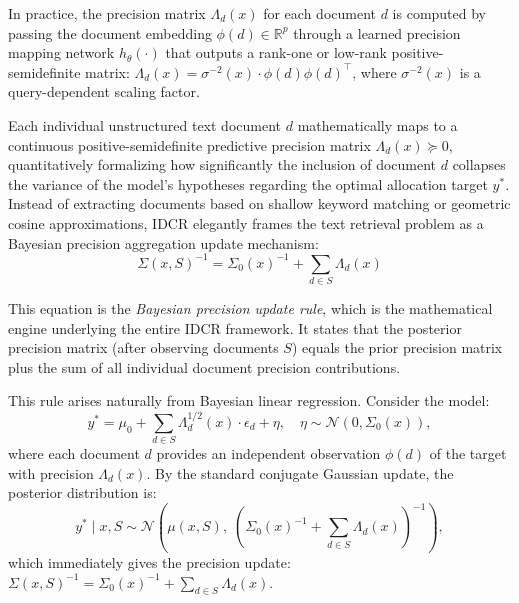 \documentclass[12pt,a4paper,oneside]{report}
\theoremstyle{definition}
\theoremstyle{remark}
\begin{document}
In practice, the precision matrix $\Lambda_d(x)$ for each document $d$ is computed by passing the document embedding $\phi(d) \in \mathbb{R}^p$ through a learned precision mapping network $h_\theta(\cdot)$ that outputs a rank-one or low-rank positive-semidefinite matrix: $\Lambda_d(x) = \sigma^{-2}(x) \cdot \phi(d) \phi(d)^\top$, where $\sigma^{-2}(x)$ is a query-dependent scaling factor.

\medskip
\noindent Each individual unstructured text document $d$ mathematically maps to a continuous positive-semidefinite predictive precision matrix $\Lambda_d(x) \succeq 0$, quantitatively formalizing how significantly the inclusion of document $d$ collapses the variance of the model's hypotheses regarding the optimal allocation target $y^*$. Instead of extracting documents based on shallow keyword matching or geometric cosine approximations, IDCR elegantly frames the text retrieval problem as a Bayesian precision aggregation update mechanism:
\begin{equation} \label{eq:bayesian_update}
\Sigma(x, S)^{-1} = \Sigma_0(x)^{-1} + \sum_{d \in S} \Lambda_d(x)
\end{equation}

\medskip
\noindent This equation is the \emph{Bayesian precision update rule}, which is the mathematical engine underlying the entire IDCR framework. It states that the posterior precision matrix (after observing documents $S$) equals the prior precision matrix plus the sum of all individual document precision contributions.

This rule arises naturally from Bayesian linear regression. Consider the model:
\[
y^* = \mu_0 + \sum_{d \in S} \Lambda_d^{1/2}(x) \cdot \epsilon_d + \eta, \quad \eta \sim \mathcal{N}(0, \Sigma_0(x)),
\]
where each document $d$ provides an independent observation $\phi(d)$ of the target with precision $\Lambda_d(x)$. By the standard conjugate Gaussian update, the posterior distribution is:
\[
y^* \mid x, S \sim \mathcal{N}\left(\mu(x,S),\; \left(\Sigma_0(x)^{-1} + \sum_{d \in S} \Lambda_d(x)\right)^{-1}\right),
\]
which immediately gives the precision update: $\Sigma(x,S)^{-1} = \Sigma_0(x)^{-1} + \sum_{d \in S} \Lambda_d(x)$.
\end{document}
